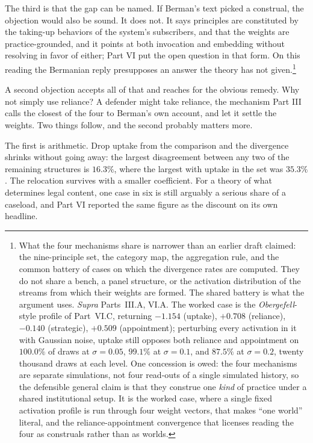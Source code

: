The third is that the gap can be named. If Berman's text picked a construal,
the objection would also be sound. It does not. It says principles are
constituted by the taking-up behaviors of the system's subscribers, and
that the weights are practice-grounded, and it points at both invocation
and embedding without resolving in favor of either; Part VI put the open question in that form. On this reading the Bermanian reply presupposes an answer the theory has
not given.\footnote{What the four mechanisms share is narrower than an earlier draft
claimed: the nine-principle set, the category map, the aggregation rule,
and the common battery of cases on which the divergence rates are computed.
They do not share a bench, a panel structure, or the activation
distribution of the streams from which their weights are formed. The shared
battery is what the argument uses. \textit{Supra} Parts~III.A, VI.A. The worked case is
the \textit{Obergefell}-style profile of Part~VI.C, returning $-1.154$
(uptake), $+0.708$ (reliance), $-0.140$ (strategic), $+0.509$
(appointment); perturbing every activation in it with Gaussian noise,
uptake still opposes both reliance and appointment on $100.0\%$ of draws
at $\sigma = 0.05$, $99.1\%$ at $\sigma = 0.1$, and $87.5\%$ at $\sigma =
0.2$, twenty thousand draws at each level. One concession is
owed: the four mechanisms are separate simulations, not four read-outs
of a single simulated history, so the defensible general claim is that
they construe one \textit{kind} of practice under a shared institutional
setup. It is the worked case, where a single fixed activation profile is
run through four weight vectors, that makes ``one world'' literal, and
the reliance-appointment convergence that licenses reading the four as
construals rather than as worlds.}

A second objection accepts all of that and reaches for the obvious remedy. Why
not simply use reliance? A defender might take reliance, the mechanism Part III calls the closest of the four to
Berman's own account, and let it settle the weights. Two things follow, and
the second probably matters more.

The first is arithmetic. Drop uptake from the comparison and the divergence shrinks without going
away: the largest disagreement between
any two of the remaining structures is $16.3\%$, where the largest with
uptake in the set was $35.3\%$. The relocation survives with a smaller
coefficient. For a theory of what determines legal content, one case in six is still
arguably a serious share of a caseload, and Part VI reported the same
figure as the discount on its own headline.


